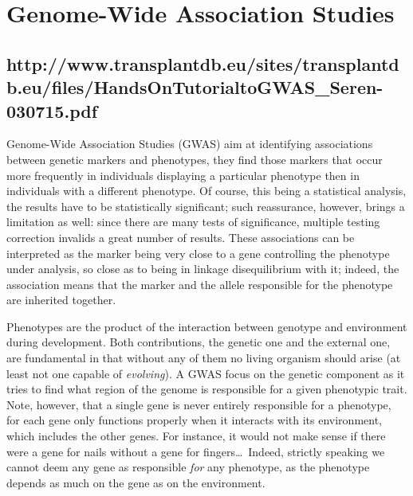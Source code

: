 \documentclass[../main.tex]{subfiles}
\begin{document}
\chapter{Genome-Wide Association Studies}

\section{http://www.transplantdb.eu/sites/transplantdb.eu/files/HandsOnTutorialtoGWAS\_Seren-030715.pdf}

Genome-Wide Association Studies (GWAS) aim at identifying associations 
between genetic markers and phenotypes, \ie they find those markers that 
occur more frequently in individuals displaying a particular phenotype 
then in individuals with a different phenotype. Of course, this being a 
statistical analysis, the results have to be statistically significant; 
such reassurance, however, brings a limitation as well: since there are 
many tests of significance, multiple testing correction invalids a great 
number of results. These associations can be interpreted as the marker 
being very close to a gene controlling the phenotype under analysis, so 
close as to being in linkage disequilibrium with it; indeed, the 
association means that the marker and the allele responsible for the 
phenotype are inherited together.

Phenotypes are the product of the interaction between genotype and 
environment during development. Both contributions, the genetic one and 
the external one, are fundamental in that without any of them no living 
organism should arise (at least not one capable of \textit{evolving}). A 
GWAS focus on the genetic component as it tries to find what region of 
the genome is responsible for a given phenotypic trait. Note, however, 
that a single gene is never entirely responsible for a phenotype, for 
each gene only functions properly when it interacts with its 
environment, which includes the other genes. For instance, it would not 
make sense if there were a gene for nails without a gene for 
fingers\ldots\ Indeed, strictly speaking we cannot deem any gene as 
responsible \textit{for} any phenotype, as the phenotype depends as much 
on the gene as on the environment.
\end{document}
